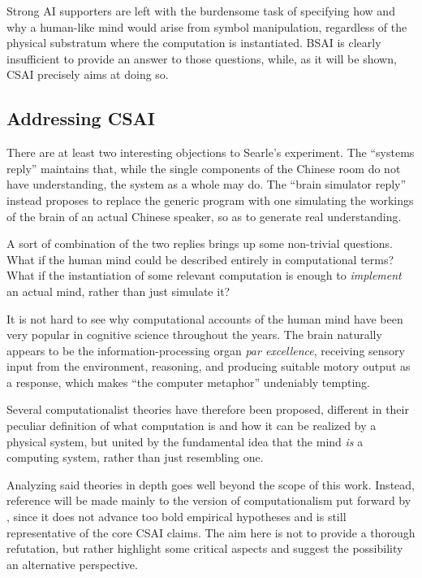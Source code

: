 \documentclass{article}
\begin{document}
Strong AI supporters are left with the burdensome task of specifying how and why a human-like mind would arise from symbol manipulation, regardless of the physical substratum where the computation is instantiated. BSAI is clearly insufficient to provide an answer to those questions, while, as it will be shown, CSAI precisely aims at doing so.

\subsection{Addressing CSAI}

There are at least two interesting objections to Searle's experiment.  The ``systems reply'' maintains that, while the single components of the Chinese room do not have understanding, the system as a whole may do.  The ``brain simulator reply'' instead proposes to replace the generic program with one simulating the workings of the brain of an actual Chinese speaker, so as to generate real understanding.

A sort of combination of the two replies brings up some non-trivial questions. What if the human mind could be described entirely in computational terms? What if the instantiation of some relevant computation is enough to \textit{implement} an actual mind, rather than just simulate it?

It is not hard to see why computational accounts of the human mind have been very popular in cognitive science throughout the years. The brain naturally appears to be the information-processing organ \emph{par excellence}, receiving sensory input from the environment, reasoning, and producing suitable motory output as a response, which makes ``the computer metaphor'' undeniably tempting.

Several computationalist theories have therefore been proposed, different in their peculiar definition of what computation is and how it can be realized by a physical system, but united by the fundamental idea that the mind \emph{is} a computing system, rather than just resembling one.

Analyzing said theories in depth goes well beyond the scope of this work. Instead, reference will be made mainly to the version of computationalism put forward by \citep{chalmers2011computational}, since it does not advance too bold empirical hypotheses and is still representative of the core CSAI claims. The aim here is not to provide a thorough refutation, but rather highlight some critical aspects and suggest the possibility an alternative perspective.
\end{document}
